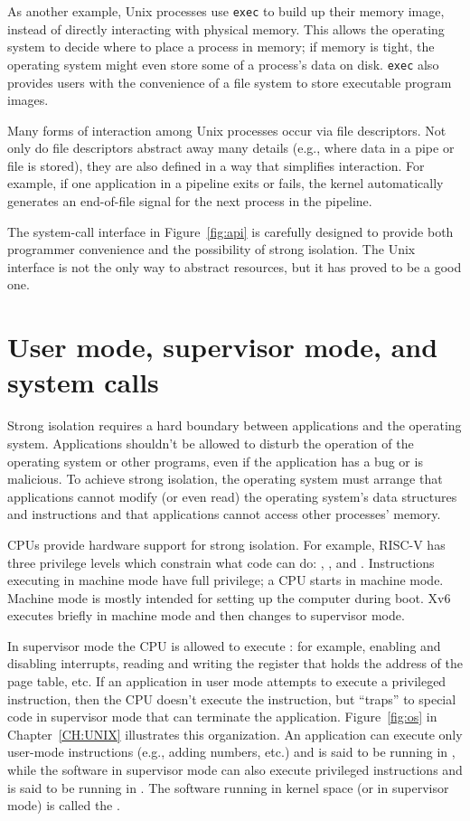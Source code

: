 As another example, Unix processes use 
\lstinline{exec}
to build up their memory image, instead of directly interacting with physical
memory.  This allows the operating system to decide where to place a process in
memory; if memory is tight, the operating system might even store some of
a process's data on disk.
\lstinline{exec}
also provides
users with the convenience of a file system to store executable program images.  

Many forms of interaction among Unix processes occur via file descriptors.
Not only do file descriptors abstract away many details (e.g.,
where data in a pipe or file is stored), they are also defined in a
way that simplifies interaction.
For example, if one application in a pipeline exits or fails, the kernel
automatically generates an end-of-file signal for the next process in the pipeline.

The system-call interface in
Figure~\ref{fig:api}
is carefully designed to provide both programmer convenience and
the possibility of strong isolation.  The Unix interface
is not the only way to abstract resources, but it has proved to be a good
one.

\section{User mode, supervisor mode, and system calls}

Strong isolation requires a hard boundary between applications and the operating
system.
Applications shouldn't be allowed to disturb the operation of
the operating system or other programs, even if the application
has a bug or is malicious.
To achieve strong isolation, the operating system must arrange that applications cannot modify (or even
read) the operating system's data structures and instructions and that
applications cannot access other processes' memory.

CPUs provide hardware support for strong isolation.   For
example, RISC-V has three privilege levels which constrain
what code can do:
,
, and
.
Instructions executing in machine mode have full privilege; a
CPU starts in machine mode.  Machine mode is mostly intended for
setting up the computer during boot.  Xv6 executes briefly in machine mode and
then changes to supervisor mode.

In supervisor mode the CPU is allowed to execute 
:
for example, enabling and disabling interrupts,  reading and writing
the register that holds the address of the page table, etc.
If an application in user mode attempts to execute
a privileged instruction, then the CPU doesn't execute the instruction, but
``traps''
to special code in supervisor mode that can terminate the application.
Figure~\ref{fig:os}
in Chapter~\ref{CH:UNIX} illustrates this organization.  An application can
execute only user-mode instructions (e.g., adding numbers, etc.) and is said to
be running in 
,
while the software in supervisor mode can also execute privileged instructions and
is said to be running in
.
The software running in kernel space (or in supervisor mode) is called
the
.

